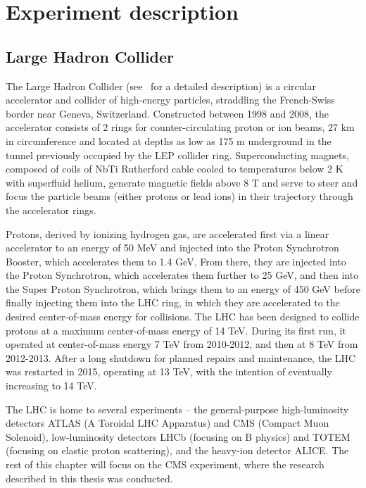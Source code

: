\chapter{Experiment description\label{sec:experiment}}

\section{Large Hadron Collider\label{sec:lhc}}

The Large Hadron Collider (see~\cite{1748-0221-3-08-S08001} for a detailed description) is a circular accelerator and collider of high-energy particles, straddling the French-Swiss border near Geneva, Switzerland. Constructed between 1998 and 2008, the accelerator consists of 2 rings for counter-circulating proton or ion beams, 27 km in circumference and located at depths as low as 175 m underground in the tunnel previously occupied by the LEP collider ring. Superconducting magnets, composed of coils of NbTi Rutherford cable cooled to temperatures below 2 K with superfluid helium, generate magnetic fields above 8 T and serve to steer and focus the particle beams (either protons or lead ions) in their trajectory through the accelerator rings.

Protons, derived by ionizing hydrogen gas, are accelerated first via a linear accelerator to an energy of 50 MeV and injected into the Proton Synchrotron Booster, which accelerates them to 1.4 GeV. From there, they are injected into the Proton Synchrotron, which accelerates them further to 25 GeV, and then into the Super Proton Synchrotron, which brings them to an energy of 450 GeV before finally injecting them into the LHC ring, in which they are accelerated to the desired center-of-mass energy for collisions. The LHC has been designed to collide protons at a maximum center-of-mass energy of 14 TeV. During its first run, it operated at center-of-mass energy 7 TeV from 2010-2012, and then at 8 TeV from 2012-2013. After a long shutdown for planned repairs and maintenance, the LHC was restarted in 2015, operating at 13 TeV, with the intention of eventually increasing to 14 TeV.

The LHC is home to several experiments -- the general-purpose high-luminosity detectors ATLAS (A Toroidal LHC Apparatus) and CMS (Compact Muon Solenoid), low-luminosity detectors LHCb (focusing on B physics) and TOTEM (focusing on elastic proton scattering), and the heavy-ion detector ALICE. The rest of this chapter will focus on the CMS experiment, where the research described in this thesis was conducted.

